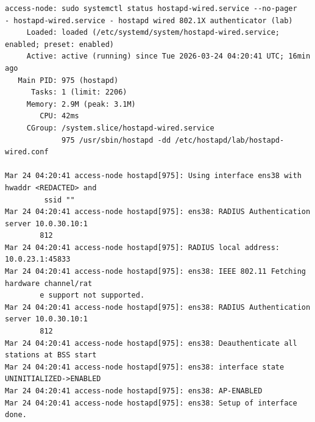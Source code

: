 \documentclass[11pt]{article}
\begin{document}
\begin{verbatim}
access-node: sudo systemctl status hostapd-wired.service --no-pager
- hostapd-wired.service - hostapd wired 802.1X authenticator (lab)
     Loaded: loaded (/etc/systemd/system/hostapd-wired.service; enabled; preset: enabled)
     Active: active (running) since Tue 2026-03-24 04:20:41 UTC; 16min ago
   Main PID: 975 (hostapd)
      Tasks: 1 (limit: 2206)
     Memory: 2.9M (peak: 3.1M)
        CPU: 42ms
     CGroup: /system.slice/hostapd-wired.service
             975 /usr/sbin/hostapd -dd /etc/hostapd/lab/hostapd-wired.conf

Mar 24 04:20:41 access-node hostapd[975]: Using interface ens38 with hwaddr <REDACTED> and
         ssid ""
Mar 24 04:20:41 access-node hostapd[975]: ens38: RADIUS Authentication server 10.0.30.10:1
        812
Mar 24 04:20:41 access-node hostapd[975]: RADIUS local address: 10.0.23.1:45833
Mar 24 04:20:41 access-node hostapd[975]: ens38: IEEE 802.11 Fetching hardware channel/rat
        e support not supported.
Mar 24 04:20:41 access-node hostapd[975]: ens38: RADIUS Authentication server 10.0.30.10:1
        812
Mar 24 04:20:41 access-node hostapd[975]: ens38: Deauthenticate all stations at BSS start
Mar 24 04:20:41 access-node hostapd[975]: ens38: interface state UNINITIALIZED->ENABLED
Mar 24 04:20:41 access-node hostapd[975]: ens38: AP-ENABLED
Mar 24 04:20:41 access-node hostapd[975]: ens38: Setup of interface done.


\end{verbatim}
\end{document}

